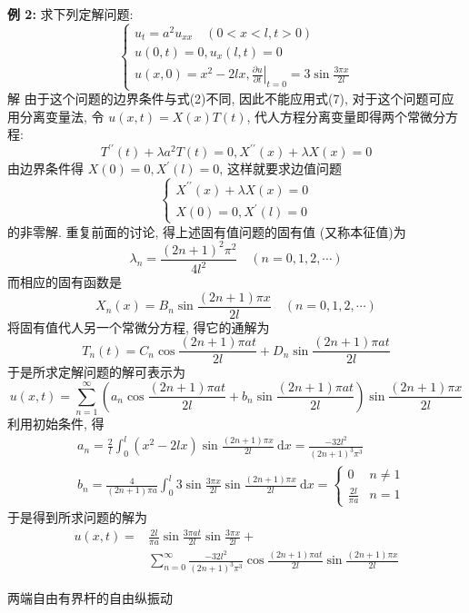 \textbf{例 2: }求下列定解问题:
$$
\left\{\begin{array}{l}
u_{t}=a^{2} u_{x x} \quad(0<x<l, t>0) \\
u(0, t)=0, u_{x}(l, t)=0 \\
u(x, 0)=x^{2}-2 l x,\left.\frac{\partial u}{\partial t}\right|_{t=0}=3 \sin \frac{3 \pi x}{2 l}
\end{array}\right.
$$
解 由于这个问题的边界条件与式(2)不同, 因此不能应用式(7), 对于这个问题可应用分离变量法, 令 $ u(x, t)=X(x) T(t) $, 代人方程分离变量即得两个常微分方程:
$$
T^{\prime \prime}(t)+\lambda a^{2} T(t)=0, X^{\prime \prime}(x)+\lambda X(x)=0
$$
由边界条件得 $ X(0)=0, X^{\prime}(l)=0 $, 这样就要求边值问题
$$
\left\{\begin{array}{l}
X^{\prime \prime}(x)+\lambda X(x)=0 \\
X(0)=0, X^{\prime}(l)=0
\end{array}\right.
$$
的非零解.
重复前面的讨论, 得上述固有值问题的固有值 (又称本征值)为
$$
\lambda_{n}=\frac{(2 n+1)^{2} \pi^{2}}{4 l^{2}} \quad(n=0,1,2, \cdots)
$$
而相应的固有函数是
$$
X_{n}(x)=B_{n} \sin \frac{(2 n+1) \pi x}{2 l} \quad(n=0,1,2, \cdots)
$$
将固有值代人另一个常微分方程, 得它的通解为
$$
T_{n}(t)=C_{n} \cos \frac{(2 n+1) \pi a t}{2 l}+D_{n} \sin \frac{(2 n+1) \pi a t}{2 l}
$$
于是所求定解问题的解可表示为
$$
u(x, t)=\sum_{n=1}^{\infty}\left(a_{n} \cos \frac{(2 n+1) \pi a t}{2 l}+b_{n} \sin \frac{(2 n+1) \pi a t}{2 l}\right) \sin \frac{(2 n+1) \pi x}{2 l}
$$
利用初始条件, 得
$$
\begin{aligned}
&a_{n}=\frac{2}{l} \int_{0}^{l}\left(x^{2}-2 l x\right) \sin \frac{(2 n+1) \pi x}{2 l} \mathrm{~d} x=\frac{-32 l^{2}}{(2 n+1)^{3} \pi^{3}} \\
&b_{n}=\frac{4}{(2 n+1) \pi a} \int_{0}^{l} 3 \sin \frac{3 \pi x}{2 l} \sin \frac{(2 n+1) \pi x}{2 l} \mathrm{~d} x=\left\{\begin{array}{cc}
0 & n \neq 1 \\
\frac{2 l}{\pi a} & n=1
\end{array}\right.
\end{aligned}
$$
于是得到所求问题的解为
$$
\begin{aligned}
u(x, t)= & \frac{2 l}{\pi a} \sin \frac{3 \pi a t}{2 l} \sin \frac{3 \pi x}{2 l}+ \\
& \sum_{n=0}^{\infty} \frac{-32 l^{2}}{(2 n+1)^{3} \pi^{3}} \cos \frac{(2 n+1) \pi a t}{2 l} \sin \frac{(2 n+1) \pi x}{2 l}
\end{aligned}
$$

两端自由有界杆的自由纵振动


